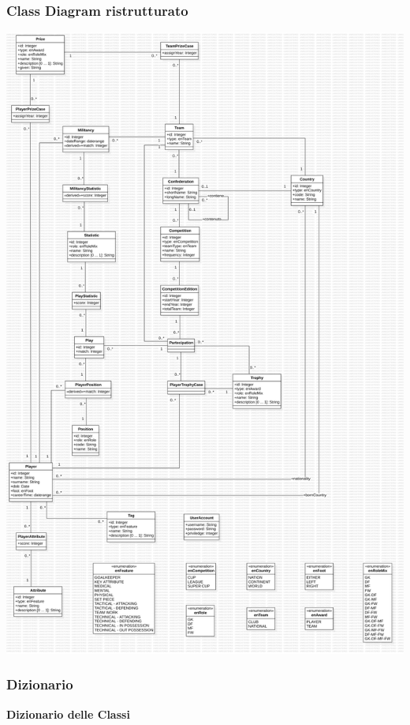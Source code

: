 \subsubsection{Class Diagram ristrutturato}
\includegraphics[scale= 0.242]{res/class_diagram_ristr}
\newpage

\subsubsection{Dizionario}

\begin{center}
	\textbf{Dizionario delle Classi}
\end{center}



